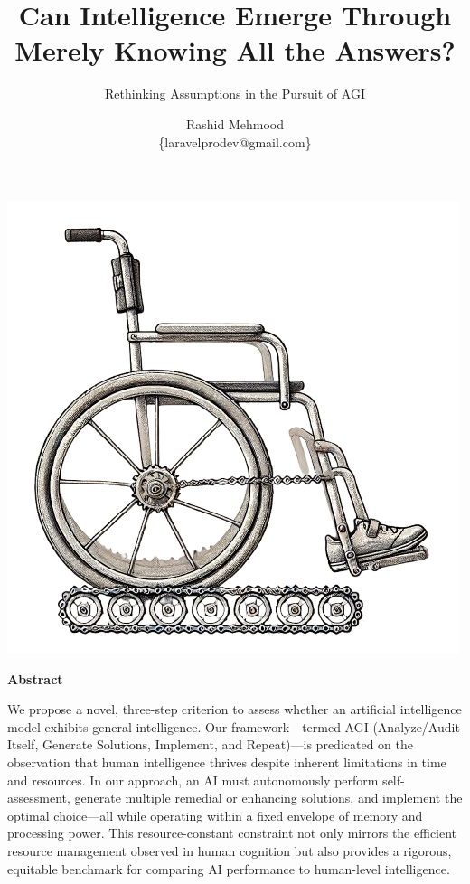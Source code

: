 \documentclass[11pt]{scrartcl}
\begin{document}
\title{Can Intelligence Emerge Through Merely Knowing All the Answers?}
\subtitle{Rethinking Assumptions in the Pursuit of AGI}
\author{Rashid Mehmood \\ \{laravelprodev@gmail.com\} }

\maketitle

\includegraphics[scale=0.6, center]{title_wheelchair.png}

\vspace{2cm}

\begin{center}
\begin{Huge}
\textbf{Abstract}
\end{Huge}
\end{center}

We propose a novel, three-step criterion to assess whether an artificial intelligence model exhibits general intelligence. Our framework—termed AGI (Analyze/Audit Itself, Generate Solutions, Implement, and Repeat)—is predicated on the observation that human intelligence thrives despite inherent limitations in time and resources. In our approach, an AI must autonomously perform self-assessment, generate multiple remedial or enhancing solutions, and implement the optimal choice—all while operating within a fixed envelope of memory and processing power. This resource-constant constraint not only mirrors the efficient resource management observed in human cognition but also provides a rigorous, equitable benchmark for comparing AI performance to human-level intelligence.\\
\end{document}

